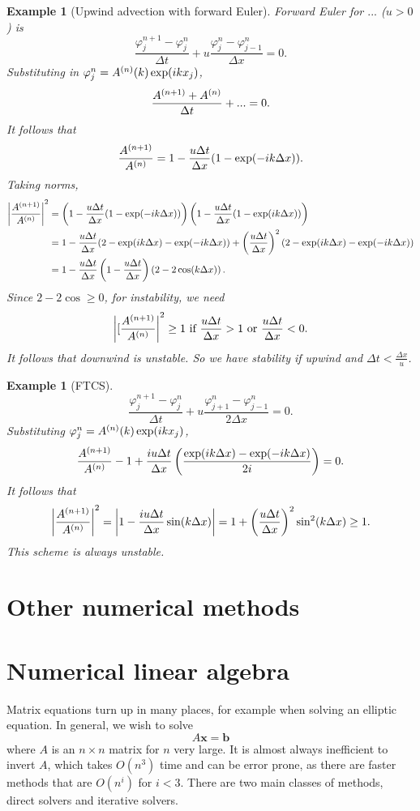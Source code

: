 \documentclass[11pt, a4paper]{article}
\renewcommand{\phi}{\varphi}
\theoremstyle{break}
\newtheorem{eg}[thm]{Example}
\newcommand*{\Size}[1]{{\left|#1\right|}}%
\newcommand*{\Paren}[1]{\left(#1\right)}%
\newcommand{\ve}{\mathbf} %
\newcommand{\dt}{\Delta t}
\newcommand{\dx}{\Delta x}
\begin{document}
\begin{eg}[Upwind advection with forward Euler]
	Forward Euler for $...$ ($u>0$) is \[\frac{\phi_j^{n+1}-\phi^n_j}{\dt}+u\frac{\phi_j^n-\phi_{j-1}^n}{\dx}=0.\] Substituting in $\phi_j^n=\A{n}(k)\exp(ikx_j)$, \[\frac{\A{n+1}+\A n}{\dt}+...=0.\]
	It follows that \[\frac{\A{n+1}}{\A n}=1-\frac{u\dt}{\dx}(1-\exp(-ik\dx)).\] Taking norms, \begin{align*}\Size{\frac{\A{n+1}}{\A n}}^2&=\Paren{1-\frac{u\dt}{\dx}(1-\exp(-ik\dx))}\Paren{1-\frac{u\dt}{\dx}(1-\exp(ik\dx))}\\
	&= 1-\frac{u\dt}{\dx}(2-\exp(ik\dx)-\exp(-ik\dx))+\Paren{\frac{u\dt}{\dx}}^2(2-\exp(i k\dx)-\exp(-ik\dx))\\&=1-\frac{u\dt}{\dx}\Paren{1-\frac{u\dt}{\dx}}\Paren{2-2\cos(k\dx)}.\end{align*} Since $2-2\cos\geq0$, for instability, we need \[\Size{[\frac{\A{n+1}}{\A n}}^2\geq 1 \text{ if } \frac{u\dt}{\dx}>1 \text{ or } \frac{u\dt}{\dx}<0.\] It follows that downwind is unstable. So we have stability if upwind and $\dt < \frac{\dx}{u}$.
\end{eg}

\begin{eg}[FTCS]

\[\frac{\phi_j^{n+1}-\phi_j^n}{\dt}+u\frac{\phi_{j+1}^n-\phi_{j-1}^n}{2\dx}=0.\]
Substituting $\phi_j^n=\A{n}(k)\exp(ikx_j)$, \[\frac{\A{n+1}}{\A n}-1 +\frac{iu\dt}{\dx}\Paren{\frac{\exp(ik\dx)-\exp(-ik\dx)}{2i}}=0.\] It follows that \[\Size{\frac{\A{n+1}}{\A n}}^2=\Size{1-\frac{iu\dt}{\dx}\sin(k\dx)}=1+\Paren{\frac{u\dt}{\dx}}^2\sin^2(k\dx)\geq 1.\] This scheme is always unstable.
\end{eg}

\section{Other numerical methods}

\section{Numerical linear algebra}\label{sec:numla}
Matrix equations turn up in many places, for example when solving an elliptic equation. In general, we wish to solve \[A\ve x=\ve b\] where $A$ is an $n\times n$ matrix for $n$ very large. It is almost always inefficient to invert $A$, which takes $O(n^3)$ time and can be error prone, as there are faster methods that are $O(n^i)$ for $i<3$. There are two main classes of methods, direct solvers and iterative solvers.
\end{document}
